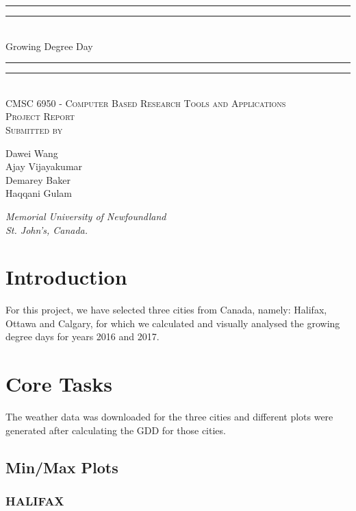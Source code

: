 \documentclass{article}
\begin{document}
{\centering

\rule{\textwidth}{1.6pt}\vspace*{-\baselineskip}\vspace*{2pt} 
\rule{\textwidth}{0.4pt}\\[\baselineskip] 
{\LARGE Growing Degree Day}
\rule{\textwidth}{0.4pt}\vspace*{-\baselineskip}\vspace{3.2pt}
\rule{\textwidth}{1.6pt}\\[\baselineskip] 

\vspace{20mm} %
\scshape %
CMSC 6950 - Computer Based Research Tools and Applications \\ [\baselineskip]
Project Report \\[\baselineskip]
\vspace{20mm} %
Submitted by \\[\baselineskip]
{\Large Dawei Wang \\ Ajay Vijayakumar \\ Demarey Baker \\ Haqqani Gulam\par}
\vfill
{\itshape Memorial University of Newfoundland \\ St. John's, Canada.\par} 
}

\newpage



\section{ \bf Introduction}
For this project, we have selected three cities from Canada, namely: Halifax, Ottawa and Calgary, for which we calculated and visually analysed the growing degree days for years 2016 and 2017.

\section{ \bf Core Tasks}
The weather data was downloaded for the three cities and different plots were generated after calculating the GDD for those cities.

\subsection{Min/Max Plots}

\subsubsection{HALIFAX}
\end{document}

